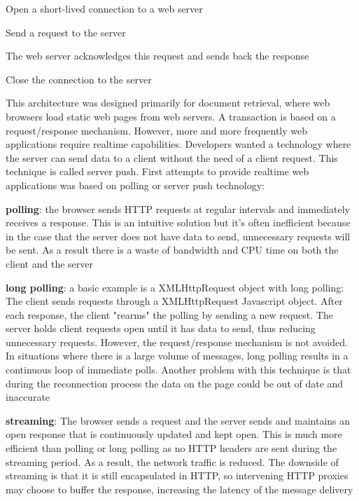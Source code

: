 \documentclass[pdftex,10pt,a4paper]{report}
\newenvironment{packed_item}{
\begin{itemize}
  \setlength{\itemsep}{1pt}
  \setlength{\parskip}{0pt}
  \setlength{\parsep}{0pt}
}{\end{itemize}}
\begin{document}
\begin{packed_item}
	\item Open a short-lived connection to a web server
	\item Send a request to the server
	\item The web server acknowledges this request and sends back the response
	\item Close the connection to the server
\end{packed_item}

This architecture was designed primarily for document retrieval, where web browsers load static web pages from web servers. A transaction is based on a request/response mechanism. However, more and more frequently web applications require realtime capabilities. Developers wanted a technology where the server can send data to a client without the need of a client request. This technique is called server push. First attempts to provide realtime web applications was based on polling or server push technology:
\begin{packed_item}
	\item \textbf{polling}: the browser sends HTTP requests at regular intervals and immediately receives a response. This is an intuitive solution but it's often inefficient because in the case that the server does not have data to send, unnecessary requests will be sent. As a result there is a waste of bandwidth and CPU time on both the client and the server
	\item \textbf{long polling}: a basic example is a XMLHttpRequest object with long polling: The client sends requests through a XMLHttpRequest Javascript object. After each response, the client "rearms" the polling by sending a new request. The server holds client requests open until it has data to send, thus reducing unnecessary requests. However, the request/response mechanism is not avoided. In situations where there is a large volume of messages, long polling results in a continuous loop of immediate polls. Another problem with this technique is that during the reconnection process the data on the page could be out of date and inaccurate
	\item \textbf{streaming}: The browser sends a request and the server sends and maintains an open response that is continuously updated and kept open. This is much more efficient than polling or long polling as no HTTP headers are sent during the streaming period. As a result, the network traffic is reduced. The downside of streaming is that it is still encapsulated in HTTP, so intervening HTTP proxies may choose to buffer the response, increasing the latency of the message delivery
\end{packed_item}
\end{document}
